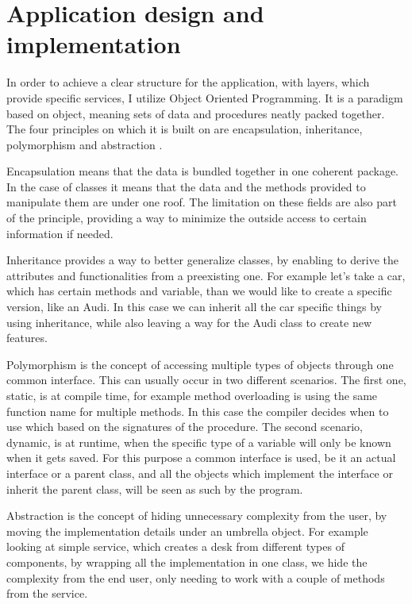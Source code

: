 \chapter{Application design and implementation}
\label{chap:design}

\par In order to achieve a clear structure for the application, with layers, which provide specific services, I utilize Object Oriented Programming. It is a paradigm based on object, meaning sets of data and procedures neatly packed together. The four principles on which it is built on are encapsulation, inheritance, polymorphism and abstraction \cite{Blaschek1994}.
\par Encapsulation means that the data is bundled together in one coherent package. In the case of classes it means that the data and the methods provided to manipulate them are under one roof. The limitation on these fields are also part of the principle, providing a way to minimize the outside access to certain information if needed.  
\par Inheritance provides a way to better generalize classes, by enabling to derive the attributes and functionalities from a preexisting one. For example let's take a car, which has certain methods and variable, than we would like to create a specific version, like an Audi. In this case we can inherit all the car specific things by using inheritance, while also leaving a way for the Audi class to create new features.
\par Polymorphism is the concept of accessing multiple types of objects through one common interface. This can usually occur in two different scenarios. The first one, static, is at compile time, for example method overloading is using the same function name for multiple methods. In this case the compiler decides when to use which based on the signatures of the procedure. The second scenario, dynamic, is at runtime, when the specific type of a variable will only be known when it gets saved. For this purpose a common interface is used, be it an actual interface or a parent class, and all the objects which implement the interface or inherit the parent class, will be seen as such by the program.  
\par Abstraction is the concept of hiding unnecessary complexity from the user, by moving the implementation details under an umbrella object. For example looking at simple service, which creates a desk from different types of components, by wrapping all the implementation in one class, we hide the complexity from the end user, only needing to work with a couple of methods from the service. 

